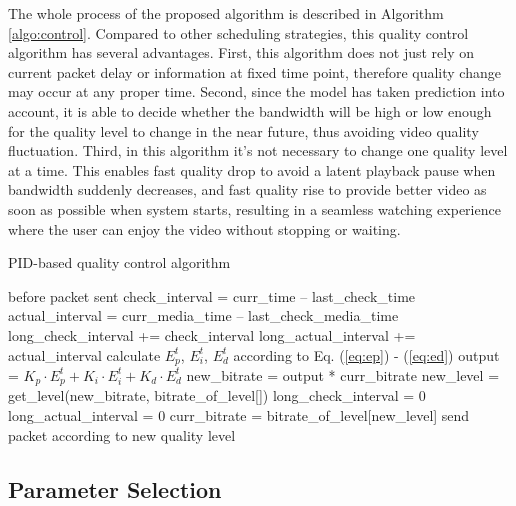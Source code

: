 \documentclass[journal]{IEEEtran}
\begin{document}
The whole process of the proposed algorithm is described in Algorithm \ref{algo:control}. Compared to other scheduling strategies, this quality control algorithm has several advantages. First, this algorithm does not just rely on current packet delay or information at fixed time point, therefore quality change may occur at any proper time. Second, since the model has taken prediction into account, it is able to decide whether the bandwidth will be high or low enough for the quality level to change in the near future, thus avoiding video quality fluctuation. Third, in this algorithm it's not necessary to change one quality level at a time. This enables fast quality drop to avoid a latent playback pause when bandwidth suddenly decreases, and fast quality rise to provide better video as soon as possible when system starts, resulting in a seamless watching experience where the user can enjoy the video without stopping or waiting.

\begin{algorithm}
\caption{PID-based quality control algorithm}
\label{algo:control}
\begin{algorithmic}
    \STATE before packet sent
    \STATE check\_interval = curr\_time -- last\_check\_time
    \STATE actual\_interval = curr\_media\_time -- last\_check\_media\_time
    \STATE long\_check\_interval += check\_interval
    \STATE long\_actual\_interval += actual\_interval
    \STATE calculate $E_p^t$, $E_i^t$, $E_d^t$ according to Eq. (\ref{eq:ep}) - (\ref{eq:ed})
    \STATE output = ${K_p} \cdot E_p^t + {K_i} \cdot E_i^t + {K_d} \cdot E_d^t$
    \STATE new\_bitrate = output * curr\_bitrate
    \STATE new\_level = get\_level(new\_bitrate, bitrate\_of\_level[])
    	\STATE long\_check\_interval = 0
    	\STATE long\_actual\_interval = 0
    	\STATE curr\_bitrate = bitrate\_of\_level[new\_level]
    \ENDIF
    \STATE send packet according to new quality level
\end{algorithmic}
\end{algorithm}


\subsection{Parameter Selection}
\label{subsec:parameter-selection}
\end{document}
